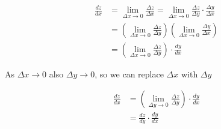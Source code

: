 \documentclass{article}
\begin{document}
\begin{align*}
    \frac{dz}{dx}
    &= \lim_{\Delta x \to 0} \frac{\Delta z}{\Delta x}
    = \lim_{\Delta x \to 0} \frac{\Delta z}{\Delta y} \cdot \frac{\Delta y}{\Delta x} \\
    &= \left(
        \lim_{\Delta x \to 0} \frac{\Delta z}{\Delta y}
    \right)
    \left(
        \lim_{\Delta x \to 0} \frac{\Delta y}{\Delta x}
    \right) \\
    &= \left(
        \lim_{\Delta x \to 0} \frac{\Delta z}{\Delta y}
    \right)
    \cdot
    \frac{dy}{dx}
\end{align*}

As \(\Delta x \to 0\) also \(\Delta y \to 0\), so we can replace \(\Delta x\) with \(\Delta y\)

\begin{align*}
    \frac{dz}{dx}
    &= \left(
        \lim_{\Delta y \to 0} \frac{\Delta z}{\Delta y}
    \right)
    \cdot
    \frac{dy}{dx} \\
    &= \frac{dz}{dy} \cdot \frac{dy}{dx}
\end{align*}
\end{document}
